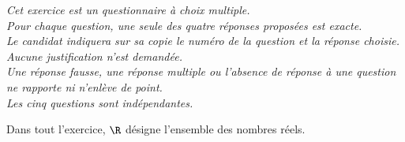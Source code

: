 \medskip

\emph{Cet exercice est un questionnaire à choix multiple.\\
Pour chaque question, une seule des quatre réponses proposées est exacte.\\
Le candidat indiquera sur sa copie le numéro de la question et la réponse choisie.\\
Aucune justification n'est demandée.\\
Une réponse fausse, une réponse multiple ou l'absence de réponse à une question ne rapporte ni n'enlève de point.\\
Les cinq questions sont indépendantes.}

\bigskip

Dans tout l'exercice, $\R$ désigne l'ensemble des nombres réels.

\medskip


